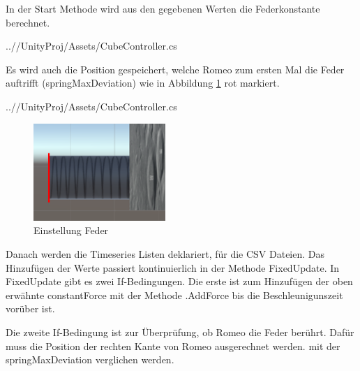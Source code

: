 \documentclass[../main.tex]{subfiles}
\begin{document}
In der Start Methode wird aus den gegebenen Werten die Federkonstante berechnet.
\begin{lstinputlisting}[label={lst:graphInelastic}, firstline=50, lastline=51]
    {..//UnityProj/Assets/CubeController.cs}
    \end{lstinputlisting}

Es wird auch die Position gespeichert, welche Romeo zum ersten Mal die Feder auftrifft (springMaxDeviation) wie in Abbildung \ref{fig:2Lab_SpringDeviation} rot markiert. 
\begin{lstinputlisting}[label={lst:graphInelastic}, firstline=46, lastline=49]
    {..//UnityProj/Assets/CubeController.cs}
    \end{lstinputlisting}


\begin{figure}[H]
    \begin{center}
    \centerline{\includegraphics[width=50mm]{./images/2Lab_SpringDeviation.PNG}}
        \caption{Einstellung Feder}
        \label{fig:2Lab_SpringDeviation}
    \end{center}
\end{figure}

Danach werden die Timeseries Listen deklariert, für die CSV Dateien. Das Hinzufügen der Werte passiert kontinuierlich in der Methode FixedUpdate.
\newline 
In FixedUpdate gibt es zwei If-Bedingungen. Die erste ist zum Hinzufügen der oben erwähnte constantForce mit der Methode .AddForce bis die Beschleunigunszeit vorüber ist. 

Die zweite If-Bedingung ist zur Überprüfung, ob Romeo die Feder berührt. Dafür muss die Position der rechten Kante von Romeo ausgerechnet werden. mit der springMaxDeviation verglichen werden. 
\end{document}
